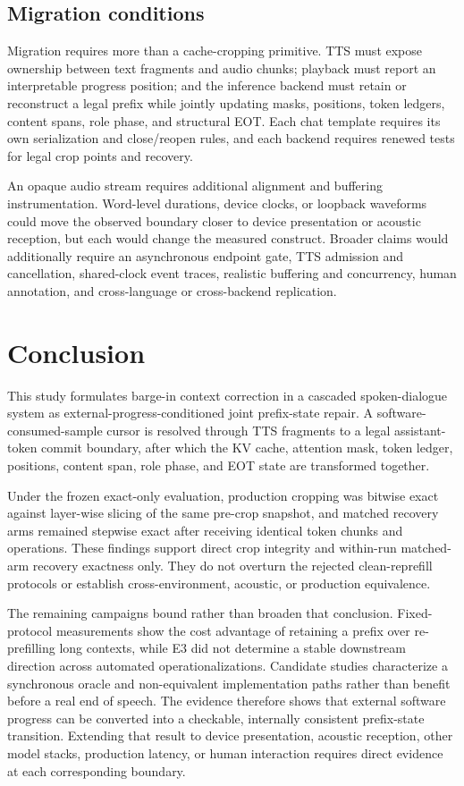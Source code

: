\subsection{Migration conditions}

Migration requires more than a cache-cropping primitive. TTS must expose ownership between text fragments and audio chunks; playback must report an interpretable progress position; and the inference backend must retain or reconstruct a legal prefix while jointly updating masks, positions, token ledgers, content spans, role phase, and structural EOT. Each chat template requires its own serialization and close/reopen rules, and each backend requires renewed tests for legal crop points and recovery.

An opaque audio stream requires additional alignment and buffering instrumentation. Word-level durations, device clocks, or loopback waveforms could move the observed boundary closer to device presentation or acoustic reception, but each would change the measured construct. Broader claims would additionally require an asynchronous endpoint gate, TTS admission and cancellation, shared-clock event traces, realistic buffering and concurrency, human annotation, and cross-language or cross-backend replication.

\section{Conclusion}
\label{sec:conclusion}

This study formulates barge-in context correction in a cascaded spoken-dialogue system as external-progress-conditioned joint prefix-state repair. A software-consumed-sample cursor is resolved through TTS fragments to a legal assistant-token commit boundary, after which the KV cache, attention mask, token ledger, positions, content span, role phase, and EOT state are transformed together.

Under the frozen exact-only evaluation, production cropping was bitwise exact against layer-wise slicing of the same pre-crop snapshot, and matched recovery arms remained stepwise exact after receiving identical token chunks and operations. These findings support direct crop integrity and within-run matched-arm recovery exactness only. They do not overturn the rejected clean-reprefill protocols or establish cross-environment, acoustic, or production equivalence.

The remaining campaigns bound rather than broaden that conclusion. Fixed-protocol measurements show the cost advantage of retaining a prefix over re-prefilling long contexts, while E3 did not determine a stable downstream direction across automated operationalizations. Candidate studies characterize a synchronous oracle and non-equivalent implementation paths rather than benefit before a real end of speech. The evidence therefore shows that external software progress can be converted into a checkable, internally consistent prefix-state transition. Extending that result to device presentation, acoustic reception, other model stacks, production latency, or human interaction requires direct evidence at each corresponding boundary.
